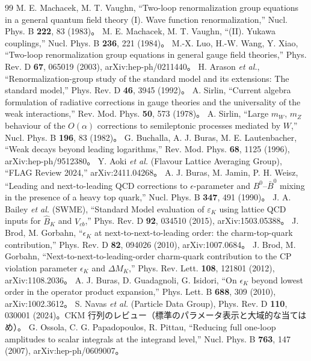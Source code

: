 \documentclass[a4paper,10pt]{ltjsarticle}
\begin{document}
\begin{thebibliography}{99}
 M. E. Machacek, M. T. Vaughn, ``Two-loop renormalization group equations in a general quantum field theory (I). Wave function renormalization,'' Nucl. Phys. B \textbf{222}, 83 (1983)。
 M. E. Machacek, M. T. Vaughn, ``(II). Yukawa couplings,'' Nucl. Phys. B \textbf{236}, 221 (1984)。
 M.-X. Luo, H.-W. Wang, Y. Xiao, ``Two-loop renormalization group equations in general gauge field theories,'' Phys. Rev. D \textbf{67}, 065019 (2003), arXiv:hep-ph/0211440。
 H. Arason \textit{et al.}, ``Renormalization-group study of the standard model and its extensions: The standard model,'' Phys. Rev. D \textbf{46}, 3945 (1992)。
 A. Sirlin, ``Current algebra formulation of radiative corrections in gauge theories and the universality of the weak interactions,'' Rev. Mod. Phys. \textbf{50}, 573 (1978)。
 A. Sirlin, ``Large $m_W$, $m_Z$ behaviour of the $O(\alpha)$ corrections to semileptonic processes mediated by $W$,'' Nucl. Phys. B \textbf{196}, 83 (1982)。
 G. Buchalla, A. J. Buras, M. E. Lautenbacher, ``Weak decays beyond leading logarithms,'' Rev. Mod. Phys. \textbf{68}, 1125 (1996), arXiv:hep-ph/9512380。
 Y. Aoki \textit{et al.} (Flavour Lattice Averaging Group), ``FLAG Review 2024,'' arXiv:2411.04268。
 A. J. Buras, M. Jamin, P. H. Weisz, ``Leading and next-to-leading QCD corrections to $\epsilon$-parameter and $B^0$--$\bar B^0$ mixing in the presence of a heavy top quark,'' Nucl. Phys. B \textbf{347}, 491 (1990)。
 J. A. Bailey \textit{et al.} (SWME), ``Standard Model evaluation of $\varepsilon_K$ using lattice QCD inputs for $\hat B_K$ and $V_{cb}$,'' Phys. Rev. D \textbf{92}, 034510 (2015), arXiv:1503.05388。
 J. Brod, M. Gorbahn, ``$\epsilon_K$ at next-to-next-to-leading order: the charm-top-quark contribution,'' Phys. Rev. D \textbf{82}, 094026 (2010), arXiv:1007.0684。
 J. Brod, M. Gorbahn, ``Next-to-next-to-leading-order charm-quark contribution to the CP violation parameter $\epsilon_K$ and $\Delta M_K$,'' Phys. Rev. Lett. \textbf{108}, 121801 (2012), arXiv:1108.2036。
 A. J. Buras, D. Guadagnoli, G. Isidori, ``On $\epsilon_K$ beyond lowest order in the operator product expansion,'' Phys. Lett. B \textbf{688}, 309 (2010), arXiv:1002.3612。
 S. Navas \textit{et al.} (Particle Data Group), Phys. Rev. D \textbf{110}, 030001 (2024)。CKM 行列のレビュー（標準のパラメータ表示と大域的な当てはめ）。
 G. Ossola, C. G. Papadopoulos, R. Pittau, ``Reducing full one-loop amplitudes to scalar integrals at the integrand level,'' Nucl. Phys. B \textbf{763}, 147 (2007), arXiv:hep-ph/0609007。

\end{thebibliography}
\end{document}

